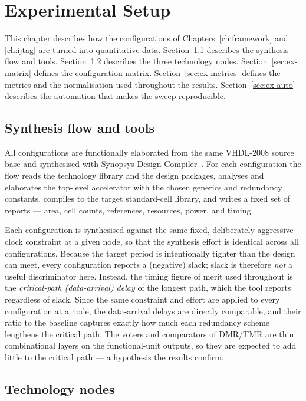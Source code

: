 \chapter{Experimental Setup}
\label{ch:experiment}

This chapter describes how the configurations of Chapters~\ref{ch:framework} and
\ref{ch:ijtag} are turned into quantitative data. Section~\ref{sec:ex-flow}
describes the synthesis flow and tools. Section~\ref{sec:ex-nodes} describes the
three technology nodes. Section~\ref{sec:ex-matrix} defines the configuration
matrix. Section~\ref{sec:ex-metrics} defines the metrics and the normalisation
used throughout the results. Section~\ref{sec:ex-auto} describes the automation
that makes the sweep reproducible.

\section{Synthesis flow and tools}
\label{sec:ex-flow}

All configurations are functionally elaborated from the same VHDL-2008 source
base and synthesised with Synopsys Design Compiler~\cite{designcompiler}. For each configuration the
flow reads the technology library and the design packages, analyses and
elaborates the top-level accelerator with the chosen generics and redundancy
constants, compiles to the target standard-cell library, and writes a fixed set
of reports --- area, cell counts, references, resources, power, and timing.

Each configuration is synthesised against the same fixed, deliberately
aggressive clock constraint at a given node, so that the synthesis effort is
identical across all configurations. Because the target period is intentionally
tighter than the design can meet, every configuration reports a (negative) slack;
slack is therefore \emph{not} a useful discriminator here. Instead, the timing
figure of merit used throughout is the \emph{critical-path (data-arrival) delay}
of the longest path, which the tool reports regardless of slack. Since the same
constraint and effort are applied to every configuration at a node, the
data-arrival delays are directly comparable, and their ratio to the baseline
captures exactly how much each redundancy scheme lengthens the critical path. The
voters and comparators of DMR/TMR are thin combinational layers on the
functional-unit outputs, so they are expected to add little to the critical path
--- a hypothesis the results confirm.

\section{Technology nodes}
\label{sec:ex-nodes}

